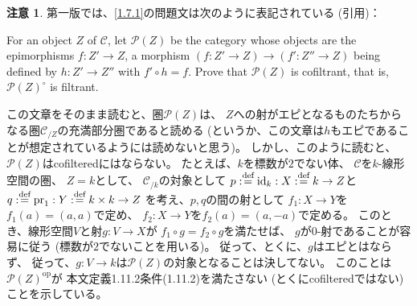 \documentclass[uplatex,dvipdfmx]{jsarticle}
\theoremstyle{definition}
\newtheorem*{rem*}{注意}
\DeclareMathOperator{\id}{\mathrm{id}}
\newcommand{\op}{\mathrm{op}}
\newcommand\mcC{\mathcal{C}}
\def\dfn{:\overset{\mbox{{\scriptsize def}}}{=}}
\begin{document}
\begin{rem*}
  第一版では、\ref{1.7.1}の問題文は次のように表記されている (引用)：

  For an object \(Z\) of \(\mcC\),
  let \(\mathscr{P}(Z)\) be the category
  whose objects are the epimorphisms \(f:Z'\to Z\),
  a morphism \((f:Z'\to Z) \to (f':Z''\to Z)\)
  being defined by \(h:Z'\to Z''\) with \(f'\circ h = f\).
  Prove that \(\mathscr{P}(Z)\) is cofiltrant,
  that is, \(\mathscr{P}(Z)^{\circ}\) is filtrant.

  この文章をそのまま読むと、圏\(\mathscr{P}(Z)\)は、
  \(Z\)への射がエピとなるものたちからなる圏\(\mcC_{/Z}\)の充満部分圏であると読める
  (というか、この文章は\(h\)もエピであることが想定されているようには読めないと思う)。
  しかし、このように読むと、
  \(\mathscr{P}(Z)\)はcofilteredにはならない。
  たとえば、\(k\)を標数が\(2\)でない体、
  \(\mcC\)を\(k\)-線形空間の圏、
  \(Z=k\)として、
  \(\mcC_{/k}\)の対象として
  \(p\dfn \id_k: X\dfn k\to Z\)と
  \(q\dfn \mathrm{pr}_1:Y \dfn k\times k \to Z\)
  を考え、\(p,q\)の間の射として
  \(f_1:X\to Y\)を\(f_1(a) = (a,a)\)で定め、
  \(f_2:X\to Y\)を\(f_2(a) = (a,-a)\)で定める。
  このとき、線形空間\(V\)と射\(g:V\to X\)が
  \(f_1\circ g = f_2\circ g\)を満たせば、
  \(g\)が\(0\)-射であることが容易に従う (標数が\(2\)でないことを用いる)。
  従って、とくに、\(g\)はエピとはならず、
  従って、\(g:V\to k\)は\(\mathscr{P}(Z)\)の対象となることは決してない。
  このことは\(\mathscr{P}(Z)^{\op}\)が
  本文定義1.11.2条件(1.11.2)を満たさない (とくにcofilteredではない) ことを示している。
\end{rem*}
\end{document}
